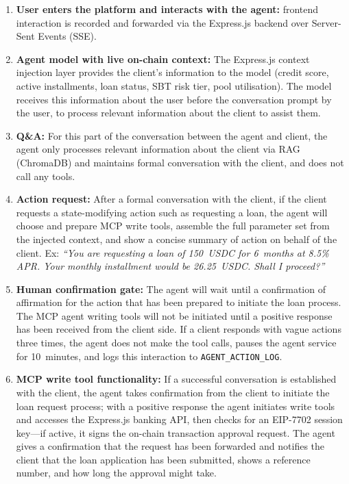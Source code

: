\documentclass[12pt,a4paper]{report}
\begin{document}
\begin{enumerate}[noitemsep]
\item \textbf{User enters the platform and interacts with the agent:} frontend interaction is recorded and forwarded via the Express.js backend over Server-Sent Events (SSE).
\item \textbf{Agent model with live on-chain context:} The Express.js context injection layer provides the client's information to the model (credit score, active installments, loan status, SBT risk tier, pool utilisation). The model receives this information about the user before the conversation prompt by the user, to process relevant information about the client to assist them.
\item \textbf{Q\&A:} For this part of the conversation between the agent and client, the agent only processes relevant information about the client via RAG (ChromaDB) and maintains formal conversation with the client, and does not call any tools.
\item \textbf{Action request:} After a formal conversation with the client, if the client requests a state-modifying action such as requesting a loan, the agent will choose and prepare MCP write tools, assemble the full parameter set from the injected context, and show a concise summary of action on behalf of the client. Ex: \emph{``You are requesting a loan of 150~USDC for 6~months at 8.5\% APR. Your monthly installment would be 26.25~USDC. Shall I proceed?''}
\item \textbf{Human confirmation gate:} The agent will wait until a confirmation of affirmation for the action that has been prepared to initiate the loan process. The MCP agent writing tools will not be initiated until a positive response has been received from the client side. If a client responds with vague actions three times, the agent does not make the tool calls, pauses the agent service for 10~minutes, and logs this interaction to \texttt{AGENT\_ACTION\_LOG}.
\item \textbf{MCP write tool functionality:} If a successful conversation is established with the client, the agent takes confirmation from the client to initiate the loan request process; with a positive response the agent initiates write tools and accesses the Express.js banking API, then checks for an EIP-7702 session key---if active, it signs the on-chain transaction approval request. The agent gives a confirmation that the request has been forwarded and notifies the client that the loan application has been submitted, shows a reference number, and how long the approval might take.
\end{enumerate}
\end{document}
